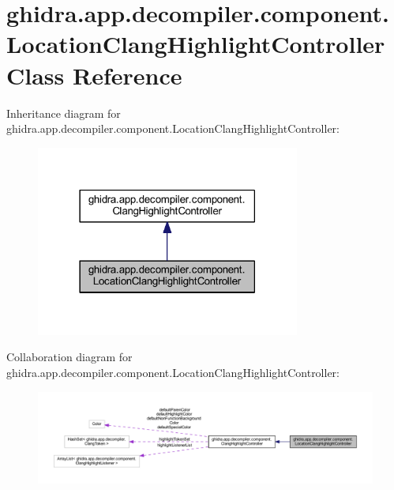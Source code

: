 \hypertarget{classghidra_1_1app_1_1decompiler_1_1component_1_1_location_clang_highlight_controller}{}\section{ghidra.\+app.\+decompiler.\+component.\+Location\+Clang\+Highlight\+Controller Class Reference}
\label{classghidra_1_1app_1_1decompiler_1_1component_1_1_location_clang_highlight_controller}


Inheritance diagram for ghidra.\+app.\+decompiler.\+component.\+Location\+Clang\+Highlight\+Controller\+:
\nopagebreak
\begin{figure}[H]
\begin{center}
\leavevmode
\includegraphics[width=246pt]{classghidra_1_1app_1_1decompiler_1_1component_1_1_location_clang_highlight_controller__inherit__graph}
\end{center}
\end{figure}


Collaboration diagram for ghidra.\+app.\+decompiler.\+component.\+Location\+Clang\+Highlight\+Controller\+:
\nopagebreak
\begin{figure}[H]
\begin{center}
\leavevmode
\includegraphics[width=350pt]{classghidra_1_1app_1_1decompiler_1_1component_1_1_location_clang_highlight_controller__coll__graph}
\end{center}
\end{figure}
